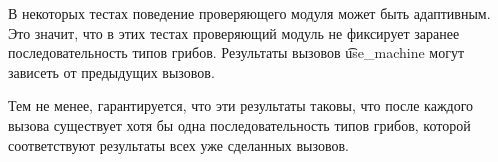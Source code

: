 В некоторых тестах поведение проверяющего модуля может быть адаптивным. Это значит, что в этих тестах проверяющий модуль не фиксирует заранее последовательность типов грибов. Результаты вызовов  \t{use\_machine} могут зависеть от предыдущих вызовов.

Тем не менее, гарантируется, что эти результаты таковы, что после каждого вызова существует хотя бы одна последовательность типов грибов, которой соответствуют результаты всех уже сделанных вызовов.

